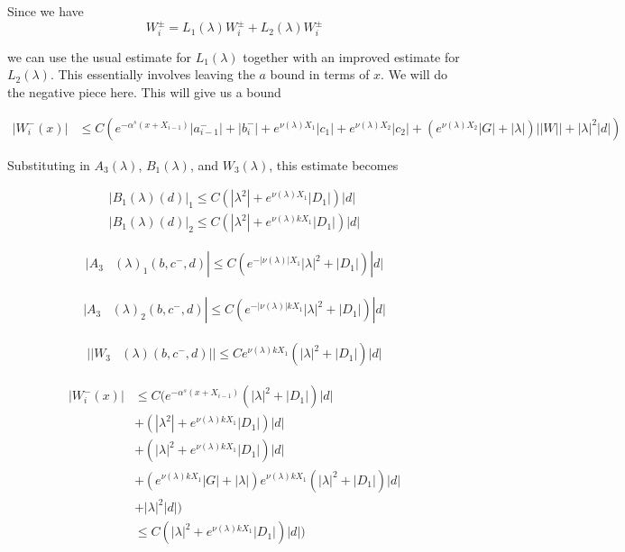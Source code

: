 \documentclass[12pt]{article}
\begin{document}
\begin{enumerate}
Since we have 
\[
W_i^\pm = L_1(\lambda)W_i^\pm + L_2(\lambda)W_i^\pm 
\]

we can use the usual estimate for $L_1(\lambda)$ together with an improved estimate for $L_2(\lambda)$. This essentially involves leaving the $a$ bound in terms of $x$. We will do the negative piece here. This will give us a bound 

\begin{align*}
| W_i^-(x)| &\leq C \left( e^{-\alpha^s(x + X_{i-1})} |a^-_{i-1}| + |b_i^-| + e^{\nu(\lambda)X_1}|c_1| + e^{\nu(\lambda)X_2}|c_2| + (e^{\nu(\lambda)X_2} |G| + |\lambda|)||W|| + |\lambda|^2 |d|  \right)
\end{align*}

Substituting in $A_3(\lambda)$, $B_1(\lambda)$, and $W_3(\lambda)$, this estimate becomes

\begin{align}
|B_1(\lambda)(d)|_1 \leq C(|\lambda^2| + e^{\nu(\lambda) X_1}|D_1|)|d| \\
|B_1(\lambda)(d)|_2 \leq C(|\lambda^2| + e^{\nu(\lambda)k X_1}|D_1|)|d|
\end{align}

\begin{align*}
|A_3&(\lambda)_1(b, c^-, d)| \leq C( e^{-|\nu(\lambda)|X_1} |\lambda|^2 + |D_1|) |d| 
\end{align*}

\begin{align*}
|A_3&(\lambda)_2(b, c^-, d)| \leq C( e^{-|\nu(\lambda)| k X_1} |\lambda|^2 + |D_1|) |d|
\end{align*}

\begin{align*}
||W_3&(\lambda)(b,c^-,d)|| \leq C e^{\nu(\lambda)k X_1} ( |\lambda|^2 + |D_1| )|d|
\end{align*}

\begin{align*}
| W_i^-(x)| &\leq C ( e^{-\alpha^s(x + X_{i-1})} ( |\lambda|^2 + |D_1|) |d| \\
&+ (|\lambda^2| + e^{\nu(\lambda)k X_1}|D_1|)|d| \\
&+ ( |\lambda|^2 + e^{\nu(\lambda)k X_1} |D_1|) |d| \\
&+ (e^{\nu(\lambda)k X_1} |G| + |\lambda|) e^{\nu(\lambda)k X_1} ( |\lambda|^2 + |D_1| )|d| \\
&+ |\lambda|^2 |d| ) \\
&\leq C(|\lambda|^2 + e^{\nu(\lambda)k X_1}|D_1|)|d|  )
\end{align*}


\end{enumerate}
\end{document}
